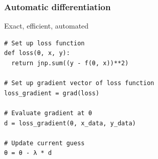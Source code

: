 \begin{frame}
    \frametitle{Automatic differentiation}

    \begin{figure}
       \begin{center}
       \end{center}
    \end{figure}

\end{frame}


\begin{frame}[fragile]
    
    \vspace{0.5em}
Exact, efficient, automated 
    
    \begin{verbatim}
# Set up loss function
def loss(θ, x, y):
  return jnp.sum((y - f(θ, x))**2)

# Set up gradient vector of loss function
loss_gradient = grad(loss)

# Evaluate gradient at θ
d = loss_gradient(θ, x_data, y_data)

# Update current guess
θ = θ - λ * d
    \end{verbatim}

\end{frame}

